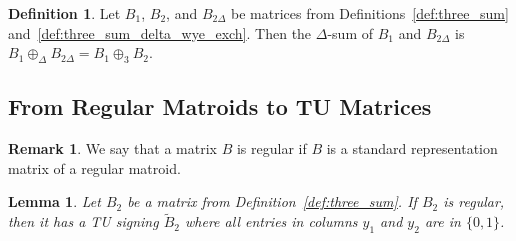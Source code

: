 \documentclass{article}
\newtheorem{lemma}{Lemma}
\theoremstyle{definition}
\newtheorem{definition}{Definition}
\newtheorem{remark}{Remark}
\begin{document}
\begin{definition}\label{def:three_delta_sum}
    Let $B_{1}$, $B_{2}$, and $B_{2 \Delta}$ be matrices from Definitions~\ref{def:three_sum} and~\ref{def:three_sum_delta_wye_exch}. Then the $\Delta$-sum of $B_{1}$ and $B_{2 \Delta}$ is $B_{1} \oplus_{\Delta} B_{2 \Delta} = B_{1} \oplus_{3} B_{2}$.
\end{definition}


\subsection{From Regular Matroids to TU Matrices}

\begin{remark}
    We say that a matrix $B$ is regular if $B$ is a standard representation matrix of a regular matroid.
\end{remark}

\begin{lemma}\label{lem:three_sum_b_2_nice_signing}
    Let $B_{2}$ be a matrix from Definition~\ref{def:three_sum}. If $B_{2}$ is regular, then it has a TU signing $\tilde{B}_{2}$ where all entries in columns $y_{1}$ and $y_{2}$ are in $\{0, 1\}$.
\end{lemma}
\end{document}
